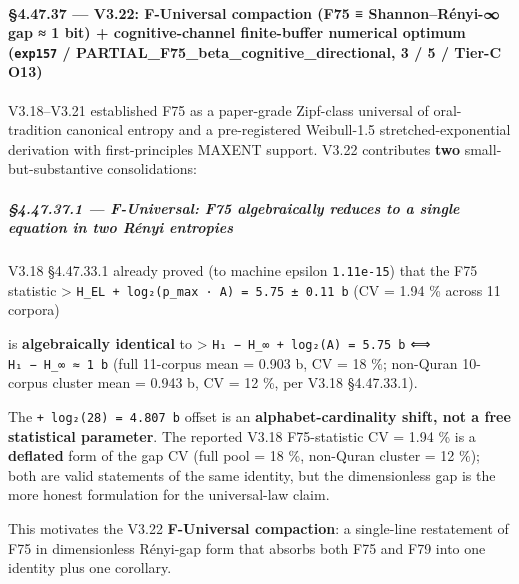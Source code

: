 \documentclass[
]{article}
\begin{document}
\paragraph{\texorpdfstring{§4.47.37 --- V3.22: F-Universal compaction
(F75 ≡ Shannon--Rényi-∞ gap ≈ 1 bit) + cognitive-channel finite-buffer
numerical optimum (\texttt{exp157} /
\textbf{PARTIAL\_F75\_beta\_cognitive\_directional}, 3 / 5 / Tier-C
O13)}{§4.47.37 --- V3.22: F-Universal compaction (F75 ≡ Shannon--Rényi-∞ gap ≈ 1 bit) + cognitive-channel finite-buffer numerical optimum (exp157 / PARTIAL\_F75\_beta\_cognitive\_directional, 3 / 5 / Tier-C O13)}}\label{v3.22-f-universal-compaction-f75-shannonruxe9nyi--gap-1-bit-cognitive-channel-finite-buffer-numerical-optimum-exp157-partial_f75_beta_cognitive_directional-3-5-tier-c-o13}

V3.18--V3.21 established F75 as a paper-grade Zipf-class universal of
oral-tradition canonical entropy and a pre-registered Weibull-1.5
stretched-exponential derivation with first-principles MAXENT support.
V3.22 contributes \textbf{two} small-but-substantive consolidations:

\subparagraph{\texorpdfstring{§4.47.37.1 --- F-Universal: F75
algebraically reduces to a \textbf{single equation} in two Rényi
entropies}{§4.47.37.1 --- F-Universal: F75 algebraically reduces to a single equation in two Rényi entropies}}\label{f-universal-f75-algebraically-reduces-to-a-single-equation-in-two-ruxe9nyi-entropies}

V3.18 §4.47.33.1 already proved (to machine epsilon \texttt{1.11e-15})
that the F75 statistic \textgreater{}
\texttt{H\_EL\ +\ log₂(p\_max\ ·\ A)\ =\ 5.75\ ±\ 0.11\ b} (CV = 1.94 \%
across 11 corpora)

is \textbf{algebraically identical} to \textgreater{}
\texttt{H₁\ −\ H\_∞\ +\ log₂(A)\ =\ 5.75\ b} ⟺
\texttt{H₁\ −\ H\_∞\ ≈\ 1\ b} (full 11-corpus mean = 0.903 b, CV = 18
\%; non-Quran 10-corpus cluster mean = 0.943 b, CV = 12 \%, per V3.18
§4.47.33.1).

The \texttt{+\ log₂(28)\ =\ 4.807\ b} offset is an
\textbf{alphabet-cardinality shift, not a free statistical parameter}.
The reported V3.18 F75-statistic CV = 1.94 \% is a \textbf{deflated}
form of the gap CV (full pool = 18 \%, non-Quran cluster = 12 \%); both
are valid statements of the same identity, but the dimensionless gap is
the more honest formulation for the universal-law claim.

This motivates the V3.22 \textbf{F-Universal compaction}: a single-line
restatement of F75 in dimensionless Rényi-gap form that absorbs both F75
and F79 into one identity plus one corollary.
\end{document}
